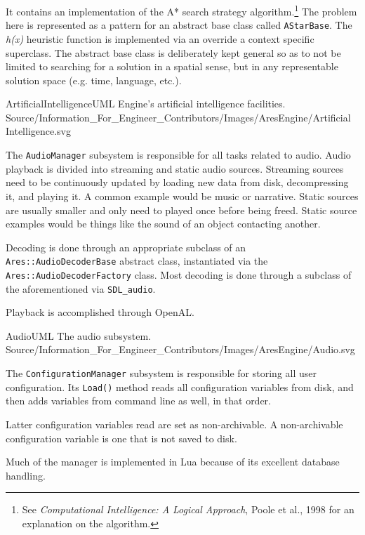 It contains an implementation of the A* search strategy algorithm.\footnote{See {\it Computational Intelligence: A Logical Approach}, Poole et al., 1998 for an explanation on the algorithm.} The problem here is represented as a pattern for an abstract base class called {\tt AStarBase}. The {\it h(x)} heuristic function is implemented via an override a context specific superclass. The abstract base class is deliberately kept general so as to not be limited to searching for a solution in a spatial sense, but in any representable solution space (e.g. time, language, etc.).

\FullPageLandscapeDiagram
    {ArtificialIntelligenceUML}
    {Engine's artificial intelligence facilities.}
    {Source/Information_For_Engineer_Contributors/Images/AresEngine/Artificial Intelligence.svg}

\page
{}
The {\tt AudioManager} subsystem is responsible for all tasks related to audio. Audio playback is divided into streaming and static audio sources. Streaming sources need to be continuously updated by loading new data from disk, decompressing it, and playing it. A common example would be music or narrative. Static sources are usually smaller and only need to played once before being freed. Static source examples would be things like the sound of an object contacting another.

Decoding is done through an appropriate subclass of an {\tt Ares::AudioDecoderBase} abstract class, instantiated via the {\tt Ares::AudioDecoderFactory} class. Most decoding is done through a subclass of the aforementioned via {\tt SDL_audio}.

Playback is accomplished through OpenAL.

\FullPageLandscapeDiagram
    {AudioUML}
    {The audio subsystem.}
    {Source/Information_For_Engineer_Contributors/Images/AresEngine/Audio.svg}

\page
{}
The {\tt ConfigurationManager} subsystem is responsible for storing all user configuration. Its {\tt Load()} method reads all configuration variables from disk, and then adds variables from command line as well, in that order. 

Latter configuration variables read are set as non-archivable. A non-archivable configuration variable is one that is not saved to disk.

Much of the manager is implemented in Lua because of its excellent database handling.

